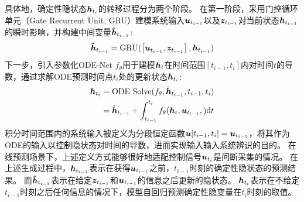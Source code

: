 具体地，确定性隐状态$\boldsymbol{h}_{t_i}$的转移过程分为两个阶段。
在第一阶段，采用门控循环单元（Gate Recurrent Unit, GRU）建模系统输入$\boldsymbol{u}_{t_{i-1}}$以及$\boldsymbol{z}_{t_{i-1}}$对当前状态$\boldsymbol{h}_{t_{i-1}}$的瞬时影响，并构建中间变量$\boldsymbol{\tilde{h}}_{t_{i-1}}$:
\begin{equation}
\thtm  = \text{GRU}(\left [\utm, \ztm\right], \htm)
\label{equ:gru}
\end{equation}
下一步，引入参数化ODE-Net $f_\theta$用于建模$\boldsymbol h_{t}$在时间范围$[t_{i-1},t_{i}]$内对时间$t$的导数，通过求解ODE预测时间点$t_i$处的更新状态$\boldsymbol{h}_{t_i}$:
\begin{equation}
\begin{aligned}
   \hti&=\text{ODE Solve}(f_\theta, \tilde{\b{h}}_{t_{i-1}}, t_{i-1}, t_i) \\
   &= \tilde{\b{h}}_{t_{i-1}} + \int_{t_{i-1}}^{t_i}f_\theta(\b h_t, \utm, ) \text{d}t
   \label{equ:ode}
\end{aligned}
\end{equation}
积分时间范围内的系统输入被定义为分段恒定函数$\boldsymbol u[t_{i-1},t_i]=\boldsymbol{u}_{t_{i-1}}$，将其作为ODE的输入以控制隐状态对时间的导数，进而实现输入输入系统辨识的目的。
在线预测场景下，上述定义方式能够很好地适配控制信号$\boldsymbol{u}_{t_i}$是间断采集的情况。
在上述生成过程中，$\boldsymbol{h}_{t_{i-1}}$表示在获得$\boldsymbol{u}_{t_{i-1}}$之前，$t_{i-1}$时刻的确定性隐状态的预测结果。
而$\boldsymbol{\tilde{h}}_{t_{i-1}}$表示在给定$\boldsymbol{z}_{t_{i-1}}$和$\boldsymbol{u}_{t_{i-1}}$的信息之后更新的隐状态。
$\boldsymbol{h}_{t_i}$表示在不给定$t_{i-1}$时刻之后任何信息的情况下，模型自回归预测确定性隐变量在$t_i$时刻的取值。

